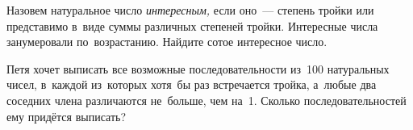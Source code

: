 \begin{problems}
\item
Назовем натуральное число \emph{интересным,} если оно~--- степень тройки или
представимо в~виде суммы различных степеней тройки.
Интересные числа занумеровали по~возрастанию.
Найдите сотое интересное число.

\item
Петя хочет выписать все возможные последовательности из~100 натуральных
чисел, в~каждой из~которых хотя~бы раз встречается тройка, а~любые два соседних
члена различаются не~больше, чем на~1.
Сколько последовательностей ему придётся выписать?

\end{problems}


